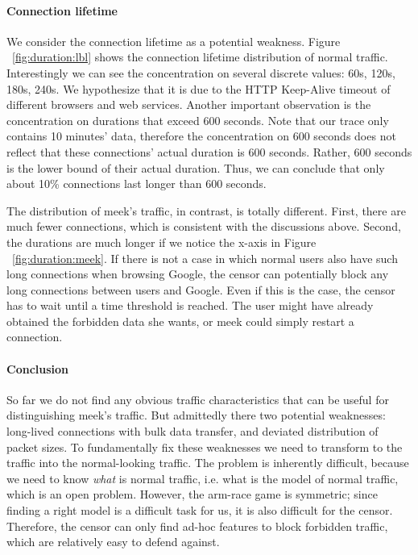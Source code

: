 \documentclass{article}
\begin{document}
\paragraph{Connection lifetime}
We consider the connection lifetime as a potential weakness. Figure ~\ref{fig:duration:lbl} shows the 
connection lifetime distribution of normal traffic. Interestingly we can see the concentration on 
several discrete values: 60s, 120s, 180s, 240s. We hypothesize that it is due to the HTTP Keep-Alive 
timeout of different browsers and web services. Another important observation is the concentration on 
durations that exceed 600 seconds. Note that our trace only contains 10 minutes' data, therefore the concentration 
on 600 seconds does not reflect that these connections' actual duration is 600 seconds. Rather, 600 seconds
is the lower bound of their actual duration. Thus, we can conclude that only about 10\% connections last 
longer than 600 seconds.

The distribution of meek's traffic, in contrast, is totally different. First, there are much fewer connections, which is 
consistent with the discussions above. Second, the durations are much longer if we notice the x-axis in Figure ~\ref{fig:duration:meek}. If there is not a case in which normal users also have such long connections when browsing Google, the 
censor can potentially block any long connections between users and Google. Even if this is the case, the
censor has to wait until a time threshold is reached. The user might have already obtained the forbidden data she wants, or 
meek could simply restart a connection.

\paragraph{Conclusion} So far we do not find any obvious traffic characteristics that can be useful for
distinguishing meek's traffic. But admittedly there two potential weaknesses: long-lived connections 
with bulk data transfer, and deviated distribution of packet sizes. To fundamentally fix these weaknesses 
we need to transform to the traffic into the normal-looking traffic. The problem is inherently difficult, because we need to know \emph{what} is normal traffic, i.e. what is the model of normal traffic, which is an open problem. However, 
the arm-race game is symmetric; since finding a right model is a difficult task for us, it is also difficult for 
the censor. Therefore, the censor can only find ad-hoc features to block forbidden traffic, which are relatively 
easy to defend against. 
\end{document}
